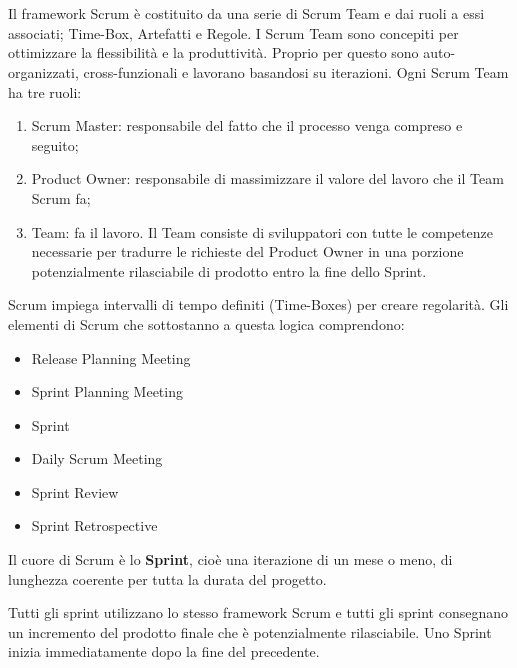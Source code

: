 \section*{\color{Blue}{LA SOSTANZA DI SCRUM}}
Il framework Scrum  \`e costituito da una serie  di
Scrum Team e dai ruoli a essi associati; Time-Box, Artefatti e Regole.
I  Scrum Team sono concepiti per   ottimizzare la  flessibilit\`a e  la produttivit\`a. Proprio per questo
sono auto-organizzati, cross-funzionali e lavorano basandosi su iterazioni.
Ogni Scrum Team ha tre ruoli: 

\begin{enumerate}
\item Scrum Master: responsabile del fatto che il processo venga compreso e seguito;
\item Product Owner: responsabile di massimizzare il valore
del lavoro  che il  Team Scrum  fa; 
\item Team: fa  il lavoro. Il Team consiste di
sviluppatori con  tutte le  competenze necessarie  per tradurre le richieste  del
Product Owner in  una
porzione potenzialmente rilasciabile di prodotto entro  la fine  dello Sprint.

\end{enumerate}

Scrum impiega intervalli di tempo definiti (Time-Boxes) per creare regolarit\`a. Gli elementi di Scrum che sottostanno a
questa logica comprendono:
\begin{itemize}
\item Release  Planning  Meeting 
\item Sprint Planning  Meeting
\item Sprint
\item Daily Scrum Meeting
\item Sprint Review
\item Sprint Retrospective
\end{itemize}

Il cuore di Scrum \`e lo \textbf{Sprint}, cio\`e una iterazione di un mese o meno, di lunghezza coerente per
tutta la durata del progetto.

Tutti gli sprint utilizzano  lo stesso framework Scrum  e tutti
gli sprint  consegnano un  incremento del  prodotto finale  che \`e potenzialmente
rilasciabile.  Uno  Sprint inizia  immediatamente  dopo la fine del precedente.


